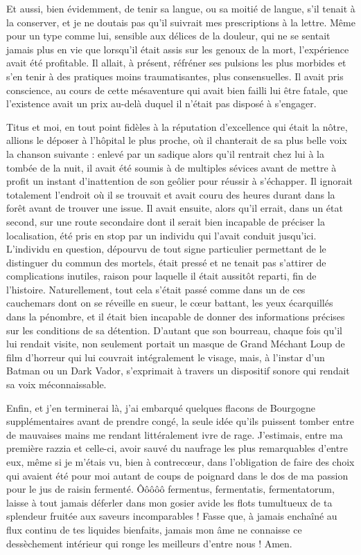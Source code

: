 Et aussi, bien évidemment, de tenir sa langue, ou sa moitié de langue, s’il tenait à la conserver, et je ne doutais pas qu’il suivrait mes prescriptions à la lettre. Même pour un type comme lui, sensible aux délices de la douleur, qui ne se sentait jamais plus en vie que lorsqu’il était assis sur les genoux de la mort, l’expérience avait été profitable. Il allait, à présent, réfréner ses pulsions les plus morbides et s’en tenir à des pratiques moins traumatisantes, plus consensuelles. Il avait pris conscience, au cours de cette mésaventure qui avait bien failli lui être fatale, que l’existence avait un prix au-delà duquel il n’était pas disposé à s’engager.

Titus et moi, en tout point fidèles à la réputation d’excellence qui était la nôtre, allions le déposer à l’hôpital le plus proche, où il chanterait de sa plus belle voix la chanson suivante : enlevé par un sadique alors qu’il rentrait chez lui à la tombée de la nuit, il avait été soumis à de multiples sévices avant de mettre à profit un instant d’inattention de son geôlier pour réussir à s’échapper. Il ignorait totalement l’endroit où il se trouvait et avait couru des heures durant dans la forêt avant de trouver une issue. Il avait ensuite, alors qu’il errait, dans un état second, sur une route secondaire dont il serait bien incapable de préciser la localisation, été pris en stop par un individu qui l’avait conduit jusqu’ici. L’individu en question, dépourvu de tout signe particulier permettant de le distinguer du commun des mortels, était pressé et ne tenait pas s’attirer de complications inutiles, raison pour laquelle il était aussitôt reparti, fin de l’histoire. Naturellement, tout cela s’était passé comme dans un de ces cauchemars dont on se réveille en sueur, le cœur battant, les yeux écarquillés dans la pénombre, et il était bien incapable de donner des informations précises sur les conditions de sa détention. D’autant que son bourreau, chaque fois qu’il lui rendait visite, non seulement portait un masque de Grand Méchant Loup de film d’horreur qui lui couvrait intégralement le visage, mais, à l’instar d’un Batman ou un Dark Vador, s’exprimait à travers un dispositif sonore qui rendait sa voix méconnaissable.

Enfin, et j’en terminerai là, j’ai embarqué quelques flacons de Bourgogne supplémentaires avant de prendre congé, la seule idée qu’ils puissent tomber entre de mauvaises mains me rendant littéralement ivre de rage. J’estimais, entre ma première razzia et celle-ci, avoir sauvé du naufrage les plus remarquables d’entre eux, même si je m’étais vu, bien à contrecœur, dans l’obligation de faire des choix qui avaient été pour moi autant de coups de poignard dans le dos de ma passion pour le jus de raisin fermenté. Ôôôôô fermentus, fermentatis, fermentatorum, laisse à tout jamais déferler dans mon gosier avide les flots tumultueux de ta splendeur fruitée aux saveurs incomparables ! Fasse que, à jamais enchaîné au flux continu de tes liquides bienfaits, jamais mon âme ne connaisse ce dessèchement intérieur qui ronge les meilleurs d’entre nous ! Amen.

